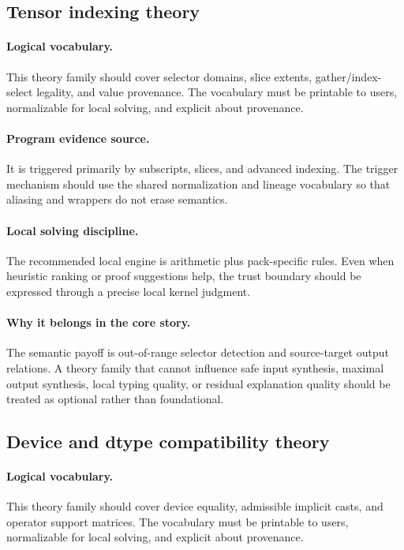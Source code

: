 \documentclass[11pt]{report}
\theoremstyle{definition}
\theoremstyle{plain}
\begin{document}
\subsection{Tensor indexing theory}

\paragraph{Logical vocabulary.}
This theory family should cover selector domains, slice extents, gather/index-select legality, and value provenance. The vocabulary must be printable to
users, normalizable for local solving, and explicit about provenance.

\paragraph{Program evidence source.}
It is triggered primarily by subscripts, slices, and advanced indexing. The trigger mechanism should use the
shared normalization and lineage vocabulary so that aliasing and wrappers do
not erase semantics.

\paragraph{Local solving discipline.}
The recommended local engine is arithmetic plus pack-specific rules. Even when heuristic ranking or
proof suggestions help, the trust boundary should be expressed through a
precise local kernel judgment.

\paragraph{Why it belongs in the core story.}
The semantic payoff is out-of-range selector detection and source-target output relations. A theory family that cannot influence safe
input synthesis, maximal output synthesis, local typing quality, or residual
explanation quality should be treated as optional rather than foundational.

\subsection{Device and dtype compatibility theory}

\paragraph{Logical vocabulary.}
This theory family should cover device equality, admissible implicit casts, and operator support matrices. The vocabulary must be printable to
users, normalizable for local solving, and explicit about provenance.
\end{document}
